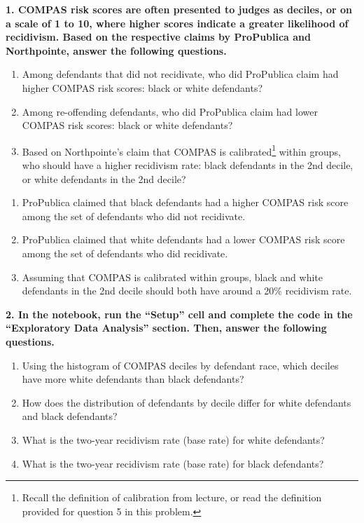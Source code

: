 \documentclass{article}
\begin{document}
\textbf{1. COMPAS risk scores are often presented to judges as deciles, or on a scale of 1 to 10, where higher scores indicate a greater likelihood of recidivism. Based on the respective claims by ProPublica and Northpointe, answer the following questions.}
\begin{enumerate}[label=\Alph*.]
\item Among defendants that did not recidivate, who did ProPublica claim had higher COMPAS risk scores: black or white defendants?
\item Among re-offending defendants, who did ProPublica claim had lower COMPAS risk scores: black or white defendants?
\item Based on Northpointe's claim that COMPAS is calibrated\footnote{Recall the definition of calibration from lecture, or read the definition provided for question 5 in this problem.} within groups, who should have a higher recidivism rate: black defendants in the 2nd decile, or white defendants in the 2nd decile?
\end{enumerate}

\bigskip
\begin{mdframed}
\begin{enumerate}[label=\Alph*.]
\item ProPublica claimed that black defendants had a higher COMPAS risk score among the set of defendants who did not recidivate. 
\item ProPublica claimed that white defendants had a lower COMPAS risk score among the set of defendants who did recidivate.
\item Assuming that COMPAS is calibrated within groups, black and white defendants in the 2nd decile should both have around a 20\% recidivism rate. 
\end{enumerate}
\end{mdframed}
\bigskip

\textbf{2. In the notebook, run the ``Setup'' cell and complete the code in the ``Exploratory Data Analysis'' section. Then, answer the following questions.}
\begin{enumerate}[label=\Alph*.]
\item Using the histogram of COMPAS deciles by defendant race, which deciles have more white defendants than black defendants?
\item How does the distribution of defendants by decile differ for white defendants and black defendants?
\item What is the two-year recidivism rate (base rate) for white defendants?
\item What is the two-year recidivism rate (base rate) for black defendants?
\end{enumerate}
\end{document}
